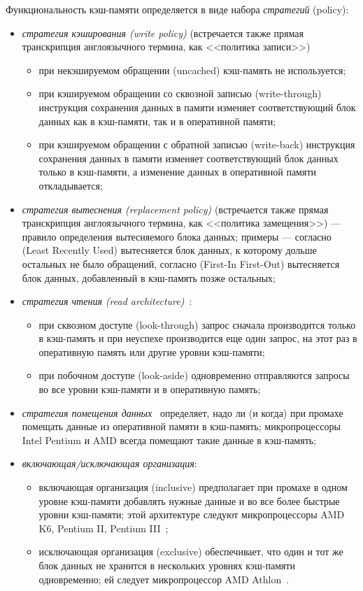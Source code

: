 Функциональность кэш-памяти определяется в виде набора \emph{стратегий} (policy):
\begin{itemize}
	\item \emph{стратегия кэширования (write policy)} (встречается также прямая транскрипция англоязычного термина, как <<политика записи>>)
		\begin{itemize}
		\item при некэшируемом обращении (uncached) кэш-память не используется;
		\item при кэшируемом обращении со сквозной записью (write-through) инструкция сохранения данных в памяти изменяет соответствующий блок данных как в кэш-памяти, так и в оперативной памяти;
		\item при кэшируемом обращении с обратной записью (write-back) инструкция сохранения данных в памяти изменяет соответствующий блок данных только в кэш-памяти, а изменение данных в оперативной памяти откладывается;
		\end{itemize}
	\item \emph{стратегия вытеснения (replacement policy)} (встречается также прямая транскрипция англоязычного термина, как <<политика замещения>>) --- правило определения вытесняемого блока данных; примеры --- согласно \LRU (Least Recently Used) вытесняется блок данных, к которому дольше остальных не было обращений, согласно \FIFO (First-In First-Out) вытесняется блок данных, добавленный в кэш-память позже остальных;
	\item \emph{стратегия чтения (read architecture)}~\cite{IntelCache}:
		\begin{itemize}
			\item при сквозном доступе (look-through) запрос сначала производится только в кэш-память и при неуспехе производится еще один запрос, на этот раз в оперативную память или другие уровни кэш-памяти;
			\item при побочном доступе (look-aside) одновременно отправляются запросы во все уровни кэш-памяти и в оперативную память;
		\end{itemize}
	\item \emph{стратегия помещения данных}~\cite{Kasperski_EffectiveMemory} определяет, надо ли (и когда) при промахе помещать данные из оперативной памяти в кэш-память; микропроцессоры Intel Pentium и AMD всегда помещают такие данные в кэш-память;
	\item \emph{включающая/исключающая организация}:
		\begin{itemize}
		\item включающая организация (inclusive) предполагает при промахе в одном уровне кэш-памяти добавлять нужные данные и во все более быстрые уровни кэш-памяти; этой архитектуре следуют микропроцессоры AMD K6, Pentium II, Pentium III~\cite{Kasperski_EffectiveMemory};
		\item исключающая организация (exclusive) обеспечивает, что один и тот же блок данных не хранится в нескольких уровнях кэш-памяти одновременно; ей следует микропроцессор AMD Athlon~\cite{Kasperski_EffectiveMemory}.
		\end{itemize}
\end{itemize}

